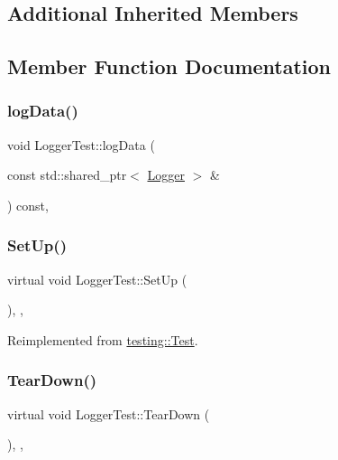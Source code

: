 \subsection*{Additional Inherited Members}


\subsection{Member Function Documentation}
\mbox{\label{classLoggerTest_a5806192b9f0f6436fb32f6be8b1939ba}} 
\subsubsection{\texorpdfstring{logData()}{logData()}}
{\footnotesize\ttfamily void Logger\+Test\+::log\+Data (\begin{DoxyParamCaption}\item[{const std\+::shared\+\_\+ptr$<$ \mbox{\hyperlink{classokapi_1_1Logger}{Logger}} $>$ \&}]{ }\end{DoxyParamCaption}) const\hspace{0.3cm}{\ttfamily [inline]}, {\ttfamily [protected]}}

\mbox{\label{classLoggerTest_afcaba51d4a2e5229bc9e16bf70bc2713}} 
\subsubsection{\texorpdfstring{SetUp()}{SetUp()}}
{\footnotesize\ttfamily virtual void Logger\+Test\+::\+Set\+Up (\begin{DoxyParamCaption}{ }\end{DoxyParamCaption})\hspace{0.3cm}{\ttfamily [inline]}, {\ttfamily [protected]}, {\ttfamily [virtual]}}



Reimplemented from \mbox{\hyperlink{classtesting_1_1Test_a190315150c303ddf801313fd1a777733}{testing\+::\+Test}}.

\mbox{\label{classLoggerTest_a15b74baf82578cfb0cd04cd978bc248f}} 
\subsubsection{\texorpdfstring{TearDown()}{TearDown()}}
{\footnotesize\ttfamily virtual void Logger\+Test\+::\+Tear\+Down (\begin{DoxyParamCaption}{ }\end{DoxyParamCaption})\hspace{0.3cm}{\ttfamily [inline]}, {\ttfamily [protected]}, {\ttfamily [virtual]}}



